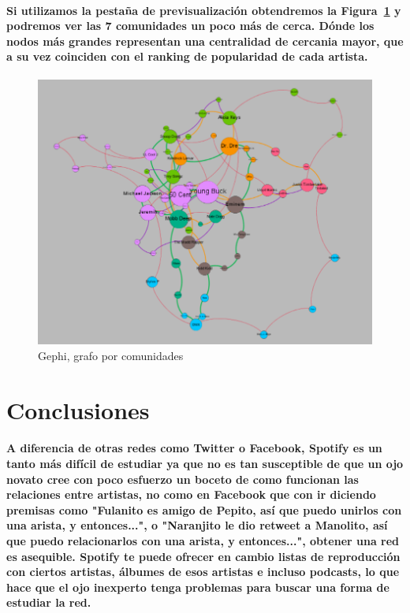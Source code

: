 \documentclass[11pt,spanish]{article}
\begin{document}
\paragraph*{Si utilizamos la pestaña de previsualización obtendremos la Figura~\ref{fig:gephi_bonito} y podremos ver las 7 comunidades un poco más de cerca. 
Dónde los nodos más grandes representan una centralidad de cercania mayor, que a su vez coinciden con el ranking de popularidad de cada artista.}

\begin{figure}[h!]
    \centering
    \includegraphics[width=150mm]{gephi_grafo_bonito.png}
    \caption{Gephi, grafo por comunidades}\label{fig:gephi_bonito}
\end{figure}
\pagebreak

\section{Conclusiones}

\paragraph*{A diferencia de otras redes como Twitter o Facebook, Spotify es un tanto más difícil de estudiar ya que no es tan susceptible de que un ojo novato cree con poco esfuerzo un boceto de como funcionan las relaciones entre artistas, 
no como en Facebook que con ir diciendo premisas como "Fulanito es amigo de Pepito, así que puedo unirlos con una arista, y entonces...", o "Naranjito le dio retweet a Manolito, así que puedo relacionarlos con una arista, y entonces...", obtener una red es asequible. Spotify te puede ofrecer en cambio listas de reproducción con ciertos artistas, álbumes de esos artistas e incluso podcasts, lo que hace que el ojo inexperto tenga problemas para buscar una forma de estudiar la red. }
\end{document}
